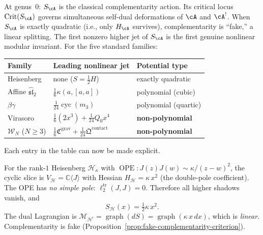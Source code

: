 \begin{remark}
At genus~$0$: $S_{\cA}$ is the classical complementarity action.
Its critical locus $\operatorname{Crit}(S_{\cA})$ governs
simultaneous self-dual deformations of $\cA$ and $\cA^!$.
When $S_{\cA}$ is exactly quadratic (i.e., only $H_{\cA}$
survives), complementarity is ``fake,'' a linear splitting.
The first nonzero higher jet of $S_{\cA}$ is the first genuine
nonlinear modular invariant. For the five standard families:
\begin{center}
\begin{tabular}{@{}lll@{}}
\toprule
Family & Leading nonlinear jet & Potential type \\
\midrule
Heisenberg & none ($S = \frac12 H$) & exactly quadratic \\
Affine $\widehat{\mathfrak{sl}}_2$ &
$\frac16\kappa(a,[a,a])$ & polynomial (cubic) \\
$\beta\gamma$ & $\frac{1}{24}\operatorname{cyc}(m_3)$ &
polynomial (quartic) \\
Virasoro & $\frac16(2x^3) + \frac{1}{24}Q_0 x^4$ &
\textbf{non-polynomial} \\
$\mathcal{W}_N$ ($N \geq 3$) &
$\frac16\mathfrak{C}^{\mathrm{grav}} + \frac{1}{24}
\mathfrak{Q}^{\mathrm{contact}}$ &
\textbf{non-polynomial} \\
\bottomrule
\end{tabular}
\end{center}
\end{remark}

Each entry in the table can now be made explicit.

\begin{example}
\label{ex:complementarity-potential-heisenberg}
For the rank-$1$ Heisenberg $\mathcal{H}_\kappa$ with
$\operatorname{OPE}:J(z)J(w) \sim \kappa/(z{-}w)^2$, the cyclic
slice is $V_{\mathcal{H}} = \mathbb{C}\langle J\rangle$ with
Hessian $H_{\mathcal{H}} = \kappa\,x^2$ (the double-pole coefficient).
The OPE has \emph{no simple pole}: $\ell_2^{\mathrm{tr}}(J,J)=0$.
Therefore all higher shadows vanish, and
\[
S_{\mathcal{H}}(x) = \tfrac12\kappa\,x^2.
\]
The dual Lagrangian is $\mathcal{M}_{\mathcal{H}^!}
= \operatorname{graph}(dS)
= \operatorname{graph}(\kappa\,x\,dx)$, which is \emph{linear}.
Complementarity is fake
(Proposition~\ref{prop:fake-complementarity-criterion}).
\end{example}

